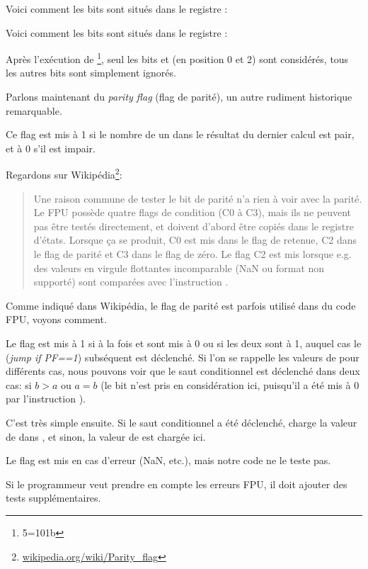 Voici comment les bits \CThreeBits sont situés dans le registre \AX:



Voici comment les bits \CThreeBits sont situés dans le registre \AH:



Après l'exécution de \footnote{5=101b}, seul les bits \Czero et \Ctwo
(en position 0 et 2) sont considérés, tous les autres bits sont simplement ignorés.

\label{parity_flag}

Parlons maintenant du \emph{parity flag} (flag de parité), un autre rudiment historique
remarquable.

Ce flag est mis à 1 si le nombre de un dans le résultat du dernier calcul est pair,
et à 0 s'il est impair.

Regardons sur Wikipédia\footnote{\href{http://go.yurichev.com/17131}{wikipedia.org/wiki/Parity\_flag}}:

\begin{framed}
\begin{quotation}
Une raison commune de tester le bit de parité n'a rien à voir avec la parité. Le FPU
possède quatre flags de condition (C0 à C3), mais ils ne peuvent pas être testés
directement, et doivent d'abord être copiés dans le registre d'états.
Lorsque ça se produit, C0 est mis dans le flag de retenue, C2 dans le flag
de parité et C3 dans le flag de zéro.
Le flag C2 est mis lorsque e.g. des valeurs en virgule flottantes incomparable
(NaN ou format non supporté) sont comparées avec l'instruction \FUCOM.
\end{quotation}
\end{framed}

Comme indiqué dans Wikipédia, le flag de parité est parfois utilisé dans du code
FPU, voyons comment.


Le flag \PF est mis à 1 si à la fois \Czero et \Ctwo sont mis à 0 ou si les deux
sont à 1, auquel cas le \JP (\emph{jump if PF==1}) subséquent est déclenché.
Si l'on se rappelle les valeurs de \CThreeBits pour différents cas, nous pouvons
voir que le saut conditionnel \JP est déclenché dans deux cas: si $b>a$ ou $a=b$
(le bit \Cthree n'est pris en considération ici, puisqu'il a été mis à 0 par l'instruction
).

C'est très simple ensuite.
Si le saut conditionnel a été déclenché, \FLD charge la valeur de  dans
, et sinon, la valeur de  est chargée ici.


Le flag \Ctwo est mis en cas d'erreur (\gls{NaN}, etc.), mais notre code ne le teste
pas.

Si le programmeur veut prendre en compte les erreurs FPU, il doit ajouter des tests
supplémentaires.


